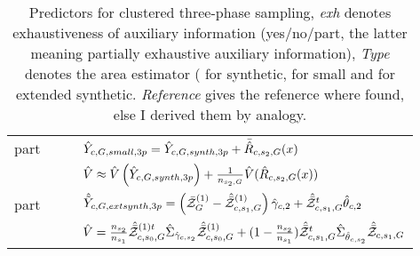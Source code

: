 \begin{table}
\begin{tabular}{ l l r l}
part 	&  \psmall{} 	& \analogy{} & $ \hat{Y}_{c,G,small,3p} = \hat{Y}_{c,G,synth,3p} + \bar{\hat{R}}_{c,s_2,G}(x)$\\
	    	&      	& \analogy{} & $ \hat{V} \approx \hat{V}\left(\hat{Y}_{c,G,synth,3p}\right) + \frac{1}{n_{s_2,G}}\hat{V}(\hat{R}_{c,s_2,G}(x))$\\
\lightrule

part 	&  \pextended{} 	& \analogy{} & $\hat{\tilde{Y}}_{c,G,ext
synth,3p} = \left( \bar{\mathcal{Z}}_{G}^{(1)}- \hat{\bar{\mathcal{Z}}}_{c,s_1,G}^{(1)}\right) \hat{\gamma}_{c,2} + \hat{\bar{\mathcal{Z}}}^t_{c,s_1,G}\hat{\theta}_{c,2} $\\
	   	&    	&    \analogy{} & $ \hat{V} = \frac{n_{s_2}}{n_{s_1}} \hat{\bar{\mathcal{Z}}}^{(1)t}_{c,s_0,G} \hat{\Sigma}_{ \hat{\gamma}_{c,s_2}} \hat{\bar{\mathcal{Z}}}^{(1)}_{c,s_0,G} + (1-\frac{n_{s_2}}{n_{s_1}})\hat{\bar{\mathcal{Z}}}^{t}_{c,s_1,G} \hat{\Sigma}_{ \hat{\theta}_{c,s_2}} \hat{\bar{\mathcal{Z}}}_{c,s_1,G}$\\

\end{tabular}
\caption{Predictors for clustered three-phase sampling, 
    \emph{exh} denotes exhaustiveness of auxiliary information (yes/no/part, the
    latter meaning partially exhaustive auxiliary information),
    \emph{Type} denotes the area estimator (\psynthetic{} for synthetic, \psmall{}
    for small and \pextended{} for extended synthetic. \emph{Reference} gives the
    refenerce where found, else I derived them by analogy. \label{tab:clustered3}
}

\end{table}

